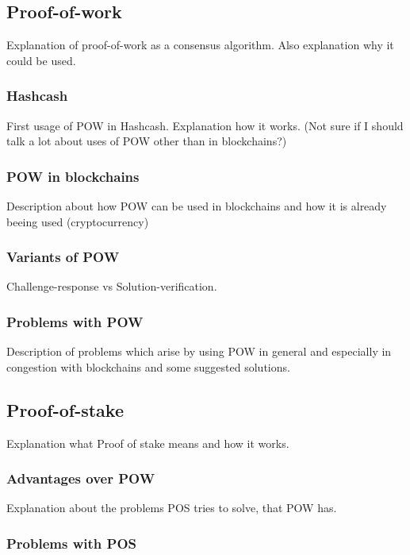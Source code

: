 \documentclass{acm_proc_article-sp}
\begin{document}
\subsection{Proof-of-work}

Explanation of proof-of-work as a consensus algorithm. Also explanation why it could be used.


\subsubsection{Hashcash}

First usage of POW in Hashcash. Explanation how it works. (Not sure if I should talk a lot about uses of POW other than in blockchains?)


\subsubsection{POW in blockchains}

Description about how POW can be used in blockchains and how it is already beeing used (cryptocurrency)


\subsubsection{Variants of POW}

Challenge-response vs Solution-verification.


\subsubsection{Problems with POW}

Description of problems which arise by using POW in general and especially in congestion with blockchains and some suggested solutions.


\subsection{Proof-of-stake}

Explanation what Proof of stake means and how it works.


\subsubsection{Advantages over POW}

Explanation about the problems POS tries to solve, that POW has.


\subsubsection{Problems with POS}
\end{document}
